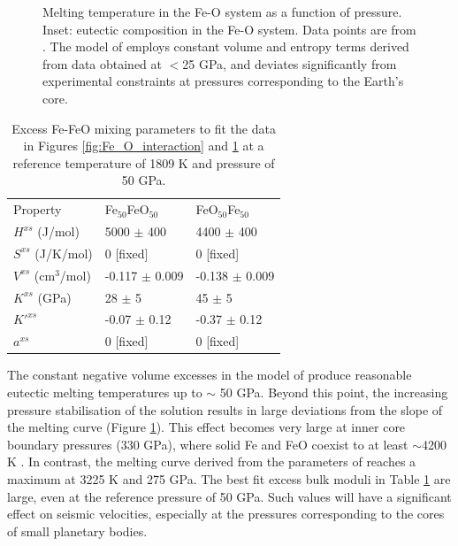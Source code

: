 \begin{figure}[ht!]
  \centering
  \caption{Melting temperature in the Fe-O system as a function of pressure. Inset: eutectic composition in the Fe-O system. Data points are from \cite{SHCPW2008}. The model of \cite{Frostetal2010} employs constant volume and entropy terms derived from data obtained at $<$25 GPa, and deviates significantly from experimental constraints at pressures corresponding to the Earth's core.}
  \label{fig:Fe_O_melting}
\end{figure}

\begin{table}[ht!]
\centering
\caption{Excess Fe-FeO mixing parameters to fit the data in Figures \ref{fig:Fe_O_interaction} and \ref{fig:Fe_O_melting} at a reference temperature of 1809 K and pressure of 50 GPa.}
\label{tab:Fe_FeO}
\begin{tabular}{lll}
  Property        & Fe$_{50}$FeO$_{50}$  & FeO$_{50}$Fe$_{50}$ \\
  $H^{xs}$ (J/mol) &  5000 $\pm$ 400 & 4400 $\pm$ 400  \\
  $S^{xs}$ (J/K/mol)  & 0 [fixed] & 0 [fixed] \\
  $V^{xs}$ (cm$^3$/mol)   & -0.117 $\pm$ 0.009 &  -0.138 $\pm$ 0.009 \\
  $K^{xs}$  (GPa)  & 28 $\pm$ 5 & 45 $\pm$ 5  \\
  $K'^{xs}$   & -0.07 $\pm$ 0.12 & -0.37 $\pm$ 0.12  \\
  $a^{xs}$   & 0 [fixed] & 0 [fixed]  
\end{tabular}
\end{table}


The constant negative volume excesses in the model of \cite{Frostetal2010} produce reasonable eutectic melting temperatures up to $\sim$ 50 GPa. Beyond this point, the increasing pressure stabilisation of the solution results in large deviations from the slope of the melting curve (Figure \ref{fig:Fe_O_melting}). This effect becomes very large at inner core boundary pressures (330 GPa), where solid Fe and FeO coexist to at least $\sim$4200 K \citep{OTHOH2011}. In contrast, the melting curve derived from the parameters of \cite{Frostetal2010} reaches a maximum at 3225 K and 275 GPa. The best fit excess bulk moduli in Table \ref{tab:Fe_FeO} are large, even at the reference pressure of 50 GPa. Such values will have a significant effect on seismic velocities, especially at the pressures corresponding to the cores of small planetary bodies.


